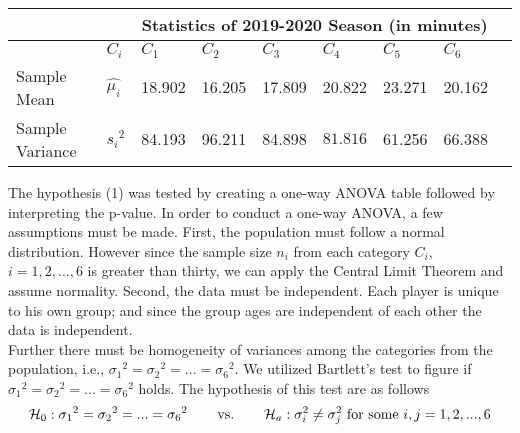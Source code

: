 \documentclass{article}
\begin{document}
\begin{center}
\begin{tabular}{ |p{2.6cm}|p{0.75cm}||p{1.3cm}|p{1.3cm}|p{1.3cm}|p{1.3cm}|p{1.3cm}|p{1.3cm}|p{1.3cm}|| }
 \hline
 &&\multicolumn{6}{|c|}{Statistics of 2019-2020 Season (in minutes) } \\
\hline
  &$C_i$& $C_1$ & $C_2$ & $C_3$ & $C_4$ & $C_5$ & $C_6$ \\
\hline
Sample Mean & $\widehat{\mu_i}$ &18.902 & 16.205 &17.809&20.822&23.271&20.162\\
 \hline
Sample Variance & ${s_i}^2$ & 84.193& 96.211  &84.898 &$81.816$&61.256&66.388\\
\hline

\end{tabular}
\end{center}



\vspace{1cm}



 The hypothesis (1) was tested by creating a one-way ANOVA table followed by interpreting the p-value. In order to conduct a one-way ANOVA, a few assumptions must be made. First, the population must follow a normal distribution. However since the sample size $n_i$ from each category $C_i$, $i=1,2,...,6$ is greater than thirty, we can apply the Central Limit Theorem and assume normality. Second, the data must be independent. Each player is unique to his own group; and since the group ages are independent of each other the data is independent.\\


Further there must be homogeneity of variances among the categories from the population, i.e., ${\sigma_1}^2={\sigma_2}^2=...={\sigma_6}^2$. We utilized Bartlett’s test to figure if ${\sigma_1}^2={\sigma_2}^2=...={\sigma_6}^2$ holds. The hypothesis of this test are as follows 
\begin{equation}
\mathcal{H}_{0}: {\sigma_1}^2={\sigma_2}^2=...={\sigma_6}^2 \hspace{0.75cm} \text{vs.} \hspace{0.75cm}\mathcal{H}_a: \sigma_i^2\neq \sigma_j^2 \text{ for some } i,j=1,2,...,6
\end{equation}
\end{document}
